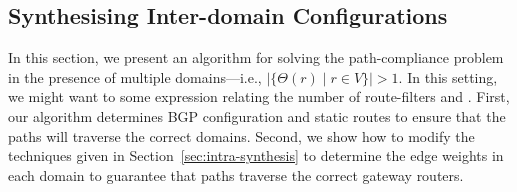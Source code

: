 \subsection{Synthesising Inter-domain Configurations}
\label{sec:inter-synthesis}


In this section, we present an algorithm for 
solving the path-compliance problem in the presence
of multiple domains---i.e., $|\{\Theta(r) \mid r\in V\}|>1$.
In this setting, we might want to some expression relating the number of 
route-filters and .
First, our algorithm determines
BGP configuration and static routes to ensure that the paths will traverse the correct
domains.
Second, we show how to modify the techniques given in Section~\ref{sec:intra-synthesis}
to determine the edge weights in each domain to guarantee that paths traverse
the correct gateway routers.


\begin{figure}
	\centering
	\hfill
	\hfill
\end{figure}

